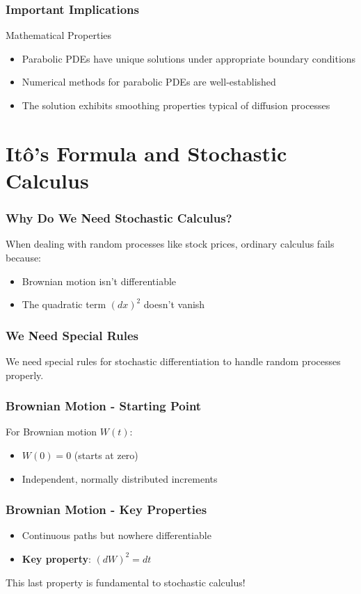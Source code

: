 \documentclass[aspectratio=169]{beamer}
\begin{document}
\begin{frame}
\frametitle{Important Implications}
\begin{block}{Mathematical Properties}
\begin{itemize}
\item Parabolic PDEs have unique solutions under appropriate boundary conditions
\item Numerical methods for parabolic PDEs are well-established
\item The solution exhibits smoothing properties typical of diffusion processes
\end{itemize}
\end{block}
\end{frame}

\section{Itô's Formula and Stochastic Calculus}

\begin{frame}
\frametitle{Why Do We Need Stochastic Calculus?}
When dealing with random processes like stock prices, ordinary calculus fails because:
\begin{itemize}
\item Brownian motion isn't differentiable
\item The quadratic term \((dx)^2\) doesn't vanish
\end{itemize}
\end{frame}

\begin{frame}
\frametitle{We Need Special Rules}
We need special rules for stochastic differentiation to handle random processes properly.
\end{frame}

\begin{frame}
\frametitle{Brownian Motion - Starting Point}
For Brownian motion \(W(t)\):
\begin{itemize}
\item \(W(0) = 0\) (starts at zero)
\item Independent, normally distributed increments
\end{itemize}
\end{frame}

\begin{frame}
\frametitle{Brownian Motion - Key Properties}
\begin{itemize}
\item Continuous paths but nowhere differentiable
\item \textbf{Key property}: \((dW)^2 = dt\)
\end{itemize}

This last property is fundamental to stochastic calculus!
\end{frame}
\end{document}
